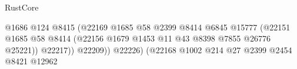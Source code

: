 \begin{lexlean}{RustCore}
\begin{coremodule}
                                                                      @1686
                                                                      @124
                                                                      @8415
                                                                      (@22169
                                                                        @1685
                                                                        @58
                                                                        @2399
                                                                        @8414
                                                                        @6845
                                                                        @15777
                                                                        (@22151
                                                                          @1685
                                                                          @58
                                                                          @8414
                                                                          (@22156
                                                                            @1679
                                                                            @1453
                                                                            @11
                                                                            @43
                                                                            @8398
                                                                            @7855
                                                                            @26776
                                                                            @25221))
                                                                        @22217))
                                                                    @22209))
                                                                @22226)
                                                              (@22168
                                                                @1002
                                                                @214
                                                                @27
                                                                @2399
                                                                @2454
                                                                @8421
                                                                @12962

\end{coremodule}
\end{lexlean}
